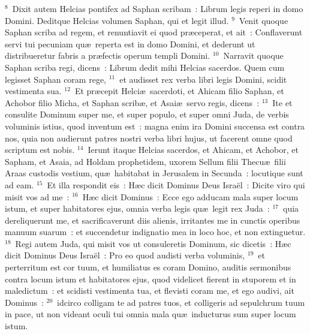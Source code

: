 ${}^{8}$~Dixit autem Helcias pontifex ad Saphan scribam~: Librum legis reperi in domo Domini. Deditque Helcias volumen Saphan, qui et legit illud.
${}^{9}$~Venit quoque Saphan scriba ad regem, et renuntiavit ei quod pr\ae ceperat, et ait~: Conflaverunt servi tui pecuniam qu\ae\ reperta est in domo Domini, et dederunt ut distribueretur fabris a pr\ae fectis operum templi Domini.
${}^{10}$~Narravit quoque Saphan scriba regi, dicens~: Librum dedit mihi Helcias sacerdos. Quem cum legisset Saphan coram rege,
${}^{11}$~et audisset rex verba libri legis Domini, scidit vestimenta sua.
${}^{12}$~Et pr\ae cepit Helci\ae\ sacerdoti, et Ahicam filio Saphan, et Achobor filio Micha, et Saphan scrib\ae , et Asai\ae\ servo regis, dicens~:
${}^{13}$~Ite et consulite Dominum super me, et super populo, et super omni Juda, de verbis voluminis istius, quod inventum est~: magna enim ira Domini succensa est contra nos, quia non audierunt patres nostri verba libri hujus, ut facerent omne quod scriptum est nobis.
${}^{14}$~Ierunt itaque Helcias sacerdos, et Ahicam, et Achobor, et Sapham, et Asaia, ad Holdam prophetidem, uxorem Sellum filii Thecu\ae\ filii Araas custodis vestium, qu\ae\ habitabat in Jerusalem in Secunda~: locutique sunt ad eam.
${}^{15}$~Et illa respondit eis~: H\ae c dicit Dominus Deus Isra\"el~: Dicite viro qui misit vos ad me~:
${}^{16}$~H\ae c dicit Dominus~: Ecce ego adducam mala super locum istum, et super habitatores ejus, omnia verba legis qu\ae\ legit rex Juda~:
${}^{17}$~quia dereliquerunt me, et sacrificaverunt diis alienis, irritantes me in cunctis operibus manuum suarum~: et succendetur indignatio mea in loco hoc, et non extinguetur.
${}^{18}$~Regi autem Juda, qui misit vos ut consuleretis Dominum, sic dicetis~: H\ae c dicit Dominus Deus Isra\"el~: Pro eo quod audisti verba voluminis,
${}^{19}$~et perterritum est cor tuum, et humiliatus es coram Domino, auditis sermonibus contra locum istum et habitatores ejus, quod videlicet fierent in stuporem et in maledictum~: et scidisti vestimenta tua, et flevisti coram me, et ego audivi, ait Dominus~:
${}^{20}$~idcirco colligam te ad patres tuos, et colligeris ad sepulchrum tuum in pace, ut non videant oculi tui omnia mala qu\ae\ inducturus sum super locum istum.

